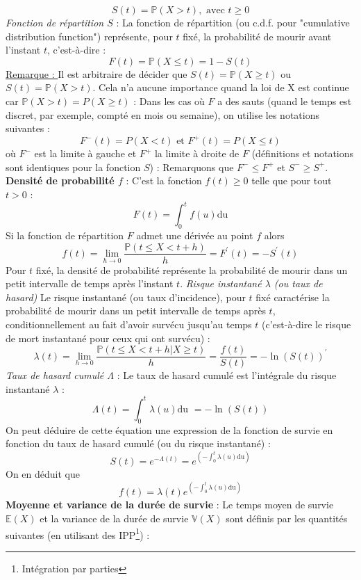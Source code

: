 $$S(t) = \mathbb{P}(X > t), \textrm{ avec } t \geq 0$$
\textit{Fonction de répartition $S$} : La fonction de répartition (ou c.d.f. pour "cumulative distribution function") représente, pour $t$ fixé, la probabilité de mourir avant l'instant $t$, c'est-à-dire :
$$F(t) = \mathbb{P}(X \leq t) = 1 - S(t)$$
\underline{Remarque : } Il est arbitraire de décider que $S(t) = \mathbb{P}(X \geq t)$ ou $S(t) = \mathbb{P}(X > t)$. Cela n'a aucune importance quand la loi de X est continue car $\mathbb{P}(X > t) = P(X \geq t)$ : Dans les cas où $F$ a des sauts (quand le temps est discret, par exemple, compté en mois ou semaine), on utilise les notations suivantes :
$$F^{-}(t) = P(X < t) \textrm{ et } F^{+}(t) = P(X \leq t)$$
où $F^{-}$ est la limite à gauche et $F^{+}$ la limite à droite de $F$ (définitions et notations sont identiques pour la fonction $S$) : Remarquons que $F^{-} \leq F^{+}$ et $S^{-} \geq S^{+}$.\newline
\textbf{Densité de probabilité $f$} : C'est la fonction $f(t) \geq 0$ telle que pour tout $t > 0$ :
$$F(t) = \int_{0}^{t} f(u)\textrm{du}$$
Si la fonction de répartition $F$ admet une dérivée au point $f$ alors 
$$f(t) = \lim\limits_{h \rightarrow 0} \frac{\mathbb{P}(t\leq X < t+h)}{h} = F^{'}(t) = - S^{'}(t)$$
Pour $t$ fixé, la densité de probabilité représente la probabilité de mourir dans un petit intervalle de temps après l'instant $t$.\newline
\textit{Risque instantané $\lambda$ (ou taux de hasard)}\newline
Le risque instantané (ou taux d'incidence), pour $t$ fixé caractérise la probabilité de mourir dans un petit intervalle de temps après $t$, conditionnellement au fait d'avoir survécu jusqu'au temps $t$ (c'est-à-dire le risque de mort instantané pour ceux qui ont survécu) :
$$\lambda(t) = \lim\limits_{h \rightarrow 0} \frac{\mathbb{P}(t\leq X < t+h| X \geq t)}{h}  = \frac{f(t)}{S(t)} = - \ln(S(t))^{'}$$
\textit{Taux de hasard cumulé $\Lambda$} : Le taux de hasard cumulé est l'intégrale du risque instantané $\lambda$ :
$$ \Lambda(t) = \int_{0}^{t}\lambda(u)\textrm{du } = -\ln(S(t))$$
On peut déduire de cette équation une expression de la fonction de survie en fonction du taux de hasard cumulé (ou du risque instantané) :
$$S(t) = e^{-\Lambda(t)} = e^{\left( -\int_{0}^{t} \lambda(u)\textrm{du} \right)}$$
On en déduit que 
$$f(t) = \lambda(t)e^{\left( -\int_{0}^{t} \lambda(u)\textrm{du} \right)}$$
\textbf{Moyenne et variance de la durée de survie} : Le temps moyen de survie $\mathbb{E}(X)$ et la variance de la durée de survie $\mathbb{V}(X)$ sont définis par les quantités suivantes (en utilisant des IPP\footnote{Intégration par parties}) :
